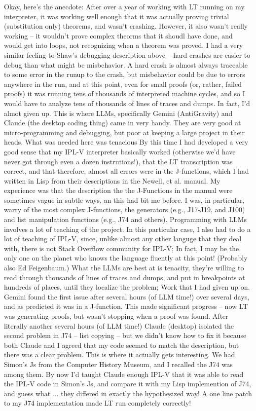 \documentclass[journal]{IEEEtran}
\begin{document}
Okay, here's the anecdote: After over a year of working with LT
running on my interpreter, it was working well enough that it was
actually proving trivial (substitution only) theorems, and wasn't
crashing. However, it also wasn't really working -- it wouldn't prove
complex theorms that it shoudl have done, and would get into loops,
not recognizing when a theorem was proved. I had a very similar
feeling to Shaw's debugging description above -- hard crashes are
easier to debug than what might be misbehavior. A hard crash is almost
always traceable to some error in the runup to the crash, but
misbehavior could be due to errors anywhere in the run, and at this
point, even for small proofs (or, rather, failed proofs) it was
running tens of thousands of interpreted machine cycles, and so I
would have to analyze tens of thousands of lines of traces and
dumps. In fact, I'd almot given up.  This is where LLMs, specifically
Gemini (AntiGravity) and Claude (the desktop coding thing) came in
very handy. They are very good at micro-programming and debugging, but
poor at keeping a large project in their heads. What was needed here
was tenacious By this time I had developed a very good sense that my
IPL-V interpreter basically worked (otherwise we'd have never got
through even a dozen instrutions!), that the LT transcription was
correct, and that therefore, almost all errors were in the
J-functions, which I had written in Lisp from their descriptions in
the Newell, et al. manual. My experience was that the description the
the J-Functions in the manual were sometimes vague in subtle ways, an
this had bit me before. I was, in particular, warry of the most
complex J-functions, the generators (e.g., J17-J19, and J100) and list
manipulation functions (e.g., J74 and others). Programming with LLMs
involves a lot of teaching of the project. In this particular case, I
also had to do a lot of teaching of IPL-V, since, unlike almost any
other languge that they deal with, there is not Stack Overflow
community for IPL-V; In fact, I may be the only one on the planet who
knows the language fluently at this point! (Probably also Ed
Feigenbaum.) What the LLMs are best at is tenacity, they're willing to
read through thousands of lines of traces and dumps, and put in
breakpoints at hundreds of places, until they localize the problem;
Work that I had given up on. Gemini found the first issue after
several hours (of LLM time!) over several days, and as predicted it
was in a J-function. This made significant progress -- now LT was
generating proofs, but wasn't stopping when a proof was found. After
literally another several hours (of LLM time!) Claude (desktop)
isolated the second problem in J74 -- list copying -- but we didn't
know how to fix it because both Claude and I agreed that my code
seemed to match the description, but there was a clear problem. This
is where it actually gets interesting. We had Simon's Js from the
Computer History Museum, and I recalled the J74 was among them. By now
I'd taught Claude enough IPL-V that it was able to read the IPL-V code
in Simon's Js, and compare it with my Lisp implemention of J74, and
guess what ... they differed in exactly the hypothesized way! A one
line patch to my J74 implementation made LT run completely correctly!
\end{document}
